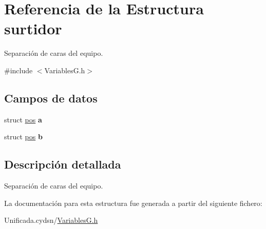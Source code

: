 \hypertarget{structsurtidor}{}\section{Referencia de la Estructura surtidor}
\label{structsurtidor}


Separación de caras del equipo.  




{\ttfamily \#include $<$Variables\+G.\+h$>$}

\subsection*{Campos de datos}
\begin{DoxyCompactItemize}
\item 
\mbox{\label{structsurtidor_afb99e2edba9cb5c1ac8873e6fdc39e79}} 
struct \mbox{\hyperlink{structpos}{pos}} {\bfseries a}
\item 
\mbox{\label{structsurtidor_a3c671fccdf0391d7d0d90b9b64f89b92}} 
struct \mbox{\hyperlink{structpos}{pos}} {\bfseries b}
\end{DoxyCompactItemize}


\subsection{Descripción detallada}
Separación de caras del equipo. 

La documentación para esta estructura fue generada a partir del siguiente fichero\+:\begin{DoxyCompactItemize}
\item 
Unificada.\+cydsn/\mbox{\hyperlink{_variables_g_8h}{Variables\+G.\+h}}\end{DoxyCompactItemize}

